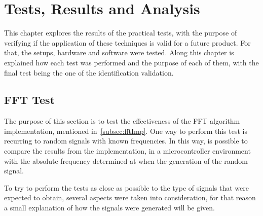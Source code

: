 \cleardoublepage
\chapter{Tests, Results and Analysis}\label{chap:Tests}
This chapter explores the results of the practical tests, with the purpose of verifying if the application of these techniques is valid for a future product. For that, the setups, hardware and software were tested. Along this chapter is explained how each test was performed and the
purpose of each of them, with the final test being the one of the identification validation.
 
\section{FFT Test}
The purpose of this section is to test the effectiveness of the FFT algorithm implementation, mentioned in~\ref{subsec:fftImp}. One way to perform this test is recurring to random signals with known frequencies. In this way, is possible to compare the results from the implementation, in a microcontroller environment with the absolute frequency determined at when the generation of the random signal.

To try to perform the tests as close as possible to the type of signals that were expected to obtain, several aspects were taken into consideration, for that reason a small explanation of how the signals were generated will be given. 
